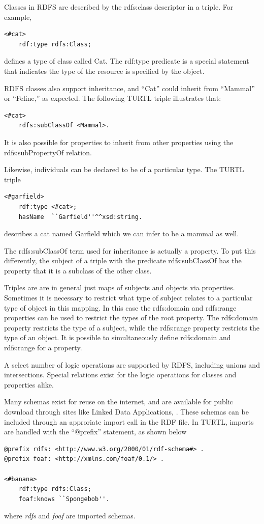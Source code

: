 Classes in RDFS are described by the rdfs:class descriptor in a triple. For
example,
\begin{lstlisting}[language=TURTL]
<#cat>
    rdf:type rdfs:Class;
\end{lstlisting}
defines a type of class called Cat. The rdf:type predicate is a special
statement that indicates the type of the resource is specified by the
object. 

RDFS classes also support inheritance, and ``Cat'' could inherit from
``Mammal'' or ``Feline,'' as expected. The following TURTL triple illustrates
that:
\begin{lstlisting}[language=TURTL]
<#cat>
    rdfs:subClassOf <Mammal>.
\end{lstlisting}
It is also possible for properties to inherit from other properties using the
rdfs:subPropertyOf relation.

Likewise, individuals can be declared to be of a particular type. The TURTL
triple
\begin{lstlisting}[language=TURTL]
<#garfield>
    rdf:type <#cat>;
    hasName  ``Garfield''^^xsd:string.
\end{lstlisting}
describes a cat named Garfield which we can infer to be a mammal as well.

The rdfs:subClassOf term used for inheritance is actually a property. To put
this differently, the subject of a triple with the predicate rdfs:subClassOf
has the property that it is a subclass of the other class. 

Triples are are in general just maps of subjects and objects via properties.
Sometimes it is necessary to restrict what type of subject relates to a
particular type of object in this mapping. In this case the rdfs:domain and
rdfs:range properties can be used to restrict the types of the root property.
The rdfs:domain property restricts the type of a subject, while the rdfs:range
property restricts the type of an object. It is possible to simultaneously
define rdfs:domain and rdfs:range for a property.

A select number of logic operations are supported by RDFS, including unions and
intersections. Special relations exist for the logic operations for classes and
properties alike.

Many schemas exist for reuse on the internet, and are available for
public download through sites like Linked Data Applications,
\cite{lov}. These schemas can be included through an approriate import
call in the RDF file. In TURTL, imports are handled with the ``@prefix''
statement, as shown below
\begin{lstlisting}[language=TURTL]
@prefix rdfs: <http://www.w3.org/2000/01/rdf-schema#> .
@prefix foaf: <http://xmlns.com/foaf/0.1/> .

<#banana>
    rdf:type rdfs:Class;
    foaf:knows ``Spongebob''.
\end{lstlisting}
where \textit{rdfs} and \textit{foaf} are imported schemas.

